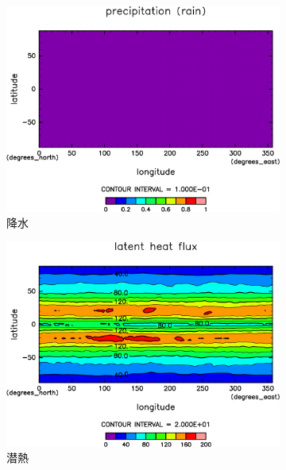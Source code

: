 \documentclass[body]{subfiles}
\begin{document}
\begin{figure}[t]
\begin{subfigure}{.4\textwidth}
		\includegraphics[width=\columnwidth]{S1500/Rain,time=3650:4015-crop-rotate.pdf}
		\caption{降水\hmu*{[W/m^{-2}]}}\label{S1500降水}
	\end{subfigure}
	\begin{subfigure}{.4\textwidth}
		\centering
		\includegraphics[width=\columnwidth]{S1500/Evap,time=3650:4015-crop-rotate.pdf}
		\caption{潜熱\hmu*{[W/m^{-2}]}}\label{S1500潜熱}
	\end{subfigure}
	\begin{subfigure}{.4\textwidth}
		\centering

\end{subfigure}
\end{figure}
\end{document}

